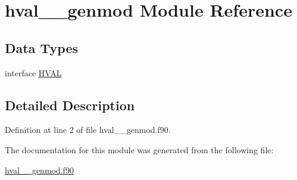 \hypertarget{classhval____genmod}{\section{hval\+\_\+\+\_\+genmod Module Reference}
\label{classhval____genmod}
}
\subsection*{Data Types}
\begin{DoxyCompactItemize}
\item 
interface \hyperlink{interfacehval____genmod_1_1HVAL}{H\+V\+A\+L}
\end{DoxyCompactItemize}


\subsection{Detailed Description}


Definition at line 2 of file hval\+\_\+\+\_\+genmod.\+f90.



The documentation for this module was generated from the following file\+:\begin{DoxyCompactItemize}
\item 
\hyperlink{hval____genmod_8f90}{hval\+\_\+\+\_\+genmod.\+f90}\end{DoxyCompactItemize}
